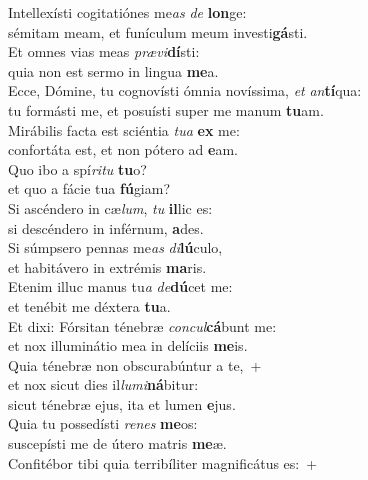 \evenverse Intellexísti cogitatiónes me\textit{as} \textit{de} \textbf{lon}ge:~\*\\
\evenverse sémitam meam, et funículum meum investi\textbf{gá}sti.\\
\oddverse Et omnes vias meas \textit{præ}\textit{vi}\textbf{dí}sti:~\*\\
\oddverse quia non est sermo in lingua \textbf{me}a.\\
\evenverse Ecce, Dómine, tu cognovísti ómnia novíssima, \textit{et} \textit{an}\textbf{tí}qua:~\*\\
\evenverse tu formásti me, et posuísti super me manum \textbf{tu}am.\\
\oddverse Mirábilis facta est sciéntia \textit{tu}\textit{a} \textbf{ex} me:~\*\\
\oddverse confortáta est, et non pótero ad \textbf{e}am.\\
\evenverse Quo ibo a spí\textit{ri}\textit{tu} \textbf{tu}o?~\*\\
\evenverse et quo a fácie tua \textbf{fú}giam?\\
\oddverse Si ascéndero in cæ\textit{lum}, \textit{tu} \textbf{il}lic es:~\*\\
\oddverse si descéndero in inférnum, \textbf{a}des.\\
\evenverse Si súmpsero pennas me\textit{as} \textit{di}\textbf{lú}culo,~\*\\
\evenverse et habitávero in extrémis \textbf{ma}ris.\\
\oddverse Etenim illuc manus tu\textit{a} \textit{de}\textbf{dú}cet me:~\*\\
\oddverse et tenébit me déxtera \textbf{tu}a.\\
\evenverse Et dixi: Fórsitan ténebræ \textit{con}\textit{cul}\textbf{cá}bunt me:~\*\\
\evenverse et nox illuminátio mea in delíciis \textbf{me}is.\\
\oddverse Quia ténebræ non obscurabúntur a te,~+\\
\oddverse  et nox sicut dies il\textit{lu}\textit{mi}\textbf{ná}bitur:~\*\\
\oddverse sicut ténebræ ejus, ita et lumen \textbf{e}jus.\\
\evenverse Quia tu possedísti \textit{re}\textit{nes} \textbf{me}os:~\*\\
\evenverse suscepísti me de útero matris \textbf{me}æ.\\
\oddverse Confitébor tibi quia terribíliter magnificátus es:~+\\
